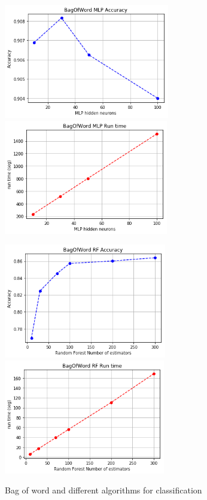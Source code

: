\documentclass[oneside,onecolumn]{article}
\begin{document}
\begin{figure}[H]
	\includegraphics[height=5cm]{report_plot/plot_bagofword/mlp_accuracy.png}
	\includegraphics[height=5cm]{report_plot/plot_bagofword/mlp_runtime.png}
	
	\includegraphics[height=5cm]{report_plot/plot_bagofword/rf_accuracy.png}
	\includegraphics[height=5cm]{report_plot/plot_bagofword/rf_runtime.png}



	\caption{Bag of word and different algorithms for classification} 
	\label{fig:lowmutation}
\end{figure}
\end{document}
